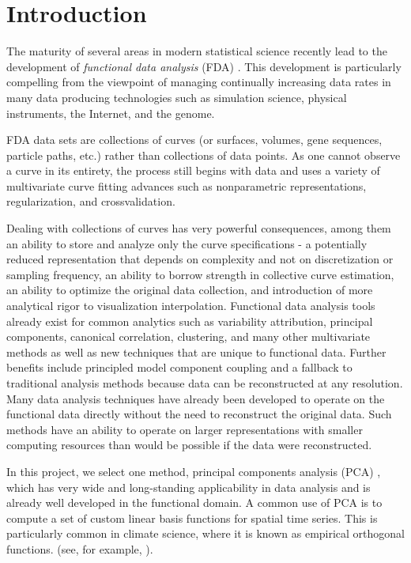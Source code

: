 \newcommand{\cA}{\mathcal{A}} %
\newcommand{\R}{\mathbb{R}} %
\newcommand{\cD}{\mathcal{D}} %
\newcommand{\cC}{\mathcal{C}} %
\newcommand{\Xs}{X^*} %
\newcommand{\cN}{\mathcal{N}} %


\section{Introduction}
\label{sec:intro}
The maturity of several areas in modern statistical science recently
lead to the development of {\em functional data analysis} (FDA)
\cite{Ramsey2005,Ferraty2006,Ramsey2009,Hsing2015}. This development
is particularly compelling from the viewpoint of managing continually
increasing data rates in many data producing technologies such as
simulation science, physical instruments, the Internet, and the
genome.

FDA data sets are collections of curves (or surfaces, volumes, gene
sequences, particle paths, etc.) rather than collections of data
points. As one cannot observe a curve in its entirety, the process
still begins with data and uses a variety of multivariate curve
fitting advances such as nonparametric representations,
regularization, and crossvalidation.

Dealing with collections of curves has very powerful consequences,
among them an ability to store and analyze only the curve
specifications - a potentially reduced representation that depends on
complexity and not on discretization or sampling frequency, an ability
to borrow strength in collective curve estimation, an ability to
optimize the original data collection, and introduction of more
analytical rigor to visualization interpolation.  Functional data
analysis tools already exist for common analytics such as variability
attribution, principal components, canonical correlation, clustering,
and many other multivariate methods as well as new techniques that are
unique to functional data. Further benefits include principled model
component coupling and a fallback to traditional analysis methods
because data can be reconstructed at any resolution. Many data
analysis techniques have already been developed to operate on the
functional data directly without the need to reconstruct the original
data. Such methods have an ability to operate on larger
representations with smaller computing resources than would be
possible if the data were reconstructed.

In this project, we select one method, principal components analysis
(PCA) \cite{Jolliffe2002}, which has very wide and long-standing
applicability in data analysis and is already well developed in the
functional domain. A common use of PCA is to compute a set of custom
linear basis functions for spatial time series. This is particularly
common in climate science, where it is known as empirical orthogonal
functions.  (see, for example, \cite{JOC2007}).

